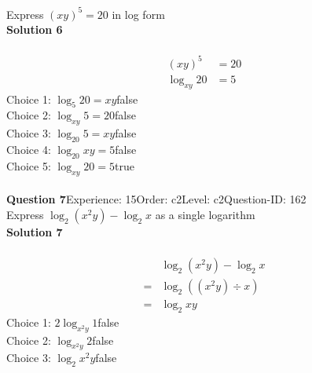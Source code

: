 \documentclass{article}
\begin{document}
Express $(xy)^5=20$ in log form\\[4pt]
\noindent\textbf{Solution 6}\\[2pt]
\\[-35pt]\begin{align*}
(xy)^5&=20\\[2pt]
\log_{xy}20&=5
\end{align*}
Choice 1: \hspace{20pt}$\log_{5}20=xy$\hspace{20pt}false\\
Choice 2: \hspace{20pt}$\log_{xy}5=20$\hspace{20pt}false\\
Choice 3: \hspace{20pt}$\log_{20}5=xy$\hspace{20pt}false\\
Choice 4: \hspace{20pt}$\log_{20}xy=5$\hspace{20pt}false\\
Choice 5: \hspace{20pt}$\log_{xy}20=5$\hspace{20pt}true\\
\\[4pt]
\noindent\textbf{Question 7}\hspace{20pt}Experience: 15\hspace{20pt}Order: c2\hspace{20pt}Level: c2\hspace{20pt}Question-ID: 162\\[2pt]
Express $\log_{2}(x^2y)-\log_{2}x$ as a single logarithm\\[4pt]
\noindent\textbf{Solution 7}\\[2pt]
\\[-35pt]\begin{align*}
&\log_{2}(x^2y)-\log_{2}x\\[2pt]
=&\log_{2}((x^2y) \div x)\\[2pt]
=&\log_{2}xy
\end{align*}
Choice 1: \hspace{20pt}$2\log_{x^2y}1$\hspace{20pt}false\\
Choice 2: \hspace{20pt}$\log_{x^2y}2$\hspace{20pt}false\\
Choice 3: \hspace{20pt}$\log_{2}x^2y$\hspace{20pt}false\\
\end{document}
